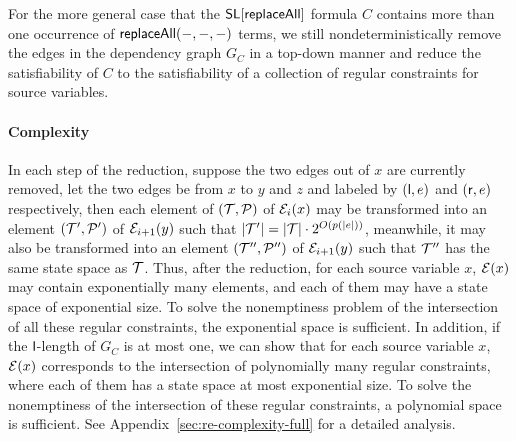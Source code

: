 
For the more general case that the $\mathsf{SL}[\mathsf{replaceAll}]$ formula $C$ contains more than one occurrence of $\mathsf{replaceAll}(-, -, -)$ terms, we still nondeterministically remove the edges in the dependency graph $G_C$ in a top-down manner and reduce the satisfiability of $C$ to the satisfiability of a collection of regular constraints for source variables.

\paragraph*{Complexity}
In each step of the reduction, suppose the two edges out of $x$ are currently removed, let the two edges be from $x$ to $y$ and $z$ and labeled by $({\sf l}, e)$ and $({\sf r}, e)$ respectively, then each element of $(\mathcal{T}, \mathcal{P})$ of $\mathcal{E}_i(x)$ may be transformed into an element $(\mathcal{T}',\mathcal{P}')$ of $\mathcal{E}_{i+1}(y)$ such that $|\mathcal{T}'| = |\mathcal{T}| \cdot 2^{O(p(|e|))}$, meanwhile, it may also be transformed into an element $(\mathcal{T}'',\mathcal{P}'')$ of $\mathcal{E}_{i+1}(y)$ such that $\mathcal{T}''$ has the same state space as $\mathcal{T}$. Thus, after the reduction, for each source variable $x$, $\mathcal{E}(x)$ may contain exponentially many elements, and each of them may have a state space of exponential size. To solve the nonemptiness problem of the intersection of all these regular constraints, the exponential space is sufficient. In addition, if the $\mathsf{l}$-length of $G_C$ is at most one, we can show that for each source variable $x$,  $\mathcal{E}(x)$ corresponds to the intersection of polynomially many regular constraints, where each of them has a state space at most exponential size. To solve the nonemptiness of the intersection of these regular constraints, a polynomial space is sufficient. See Appendix~\ref{sec:re-complexity-full} for a detailed analysis.



